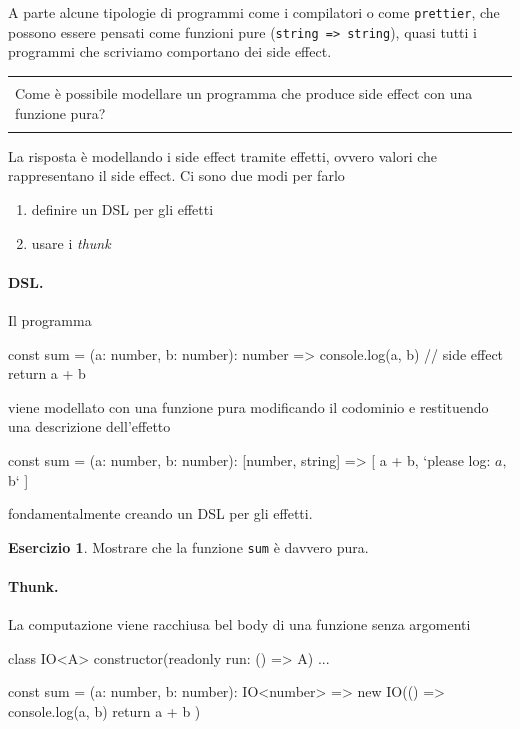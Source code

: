 \documentclass[12pt]{article}
\theoremstyle{definition}
\newtheorem{exercise}{Esercizio}[section]
\newenvironment{demo}
    {\begin{center}
    \begin{tabular}{|p{0.9\textwidth}|}
    \hline\\
    }
    {
    \\\\\hline
    \end{tabular}
    \end{center}
    }
\newenvironment{code}
  {\vspace{0.5cm} \VerbatimEnvironment\begin{typescriptcode}}
  {\end{typescriptcode} \vspace{0.2cm}}
\begin{document}
A parte alcune tipologie di programmi come i compilatori o come \texttt{prettier}, che possono essere pensati come funzioni pure (\texttt{string => string}),
quasi tutti i programmi che scriviamo comportano dei side effect.

\begin{demo}
Come è possibile modellare un programma che produce side effect con una funzione pura?
\end{demo}

La risposta è modellando i side effect tramite effetti, ovvero valori che rappresentano il side effect. Ci sono due modi per farlo

\begin{enumerate}
  \item definire un DSL per gli effetti
  \item usare i \emph{thunk}
\end{enumerate}

\paragraph{DSL.} Il programma

\begin{code}
const sum = (a: number, b: number): number => {
  console.log(a, b) // side effect
  return a + b
}
\end{code}

viene modellato con una funzione pura modificando il codominio e restituendo una descrizione dell'effetto

\begin{code}
const sum = (a: number, b: number): [number, string] => [
  a + b,
  `please log: ${a}, ${b}`
]
\end{code}

fondamentalmente creando un DSL per gli effetti.

\begin{exercise}
Mostrare che la funzione \texttt{sum} è davvero pura.
\end{exercise}

\paragraph{Thunk.} La computazione viene racchiusa bel body di una funzione senza argomenti

\begin{code}
class IO<A> {
  constructor(readonly run: () => A) {}
  ...
}

const sum = (a: number, b: number): IO<number> =>
  new IO(() => {
    console.log(a, b)
    return a + b
  })
\end{code}
\end{document}
